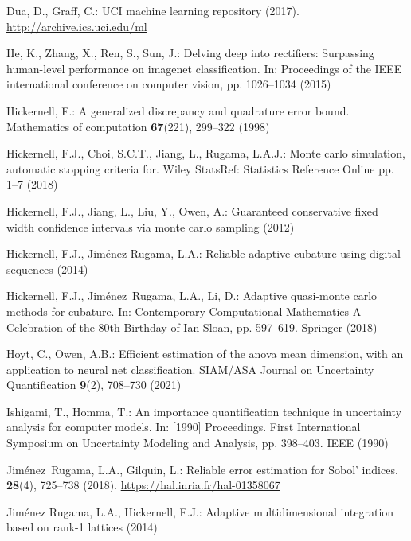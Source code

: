 \documentclass[graybox]{svmult}
\begin{document}
\begin{thebibliography}{10}
Dua, D., Graff, C.: {UCI} machine learning repository (2017).
\newblock \urlprefix\url{http://archive.ics.uci.edu/ml}

He, K., Zhang, X., Ren, S., Sun, J.: Delving deep into rectifiers: Surpassing
  human-level performance on imagenet classification.
\newblock In: Proceedings of the IEEE international conference on computer
  vision, pp. 1026--1034 (2015)

Hickernell, F.: A generalized discrepancy and quadrature error bound.
\newblock Mathematics of computation \textbf{67}(221), 299--322 (1998)

Hickernell, F.J., Choi, S.C.T., Jiang, L., Rugama, L.A.J.: Monte carlo
  simulation, automatic stopping criteria for.
\newblock Wiley StatsRef: Statistics Reference Online pp. 1--7 (2018)

Hickernell, F.J., Jiang, L., Liu, Y., Owen, A.: Guaranteed conservative fixed
  width confidence intervals via monte carlo sampling (2012)

Hickernell, F.J., {Jim\'enez Rugama}, L.A.: Reliable adaptive cubature using
  digital sequences (2014)

Hickernell, F.J., Jim\'{e}nez~Rugama, L.A., Li, D.: Adaptive quasi-monte carlo
  methods for cubature.
\newblock In: Contemporary Computational Mathematics-A Celebration of the 80th
  Birthday of Ian Sloan, pp. 597--619. Springer (2018)

Hoyt, C., Owen, A.B.: Efficient estimation of the anova mean dimension, with an
  application to neural net classification.
\newblock SIAM/ASA Journal on Uncertainty Quantification \textbf{9}(2),
  708--730 (2021)

Ishigami, T., Homma, T.: An importance quantification technique in uncertainty
  analysis for computer models.
\newblock In: [1990] Proceedings. First International Symposium on Uncertainty
  Modeling and Analysis, pp. 398--403. IEEE (1990)

Jim{\'e}nez~Rugama, L.A., Gilquin, L.: {Reliable error estimation for Sobol'
  indices}.
 \textbf{28}(4), 725--738 (2018).
\newblock \urlprefix\url{https://hal.inria.fr/hal-01358067}

{Jim\'enez Rugama}, L.A., Hickernell, F.J.: Adaptive multidimensional
  integration based on rank-1 lattices (2014)


\end{thebibliography}
\end{document}
